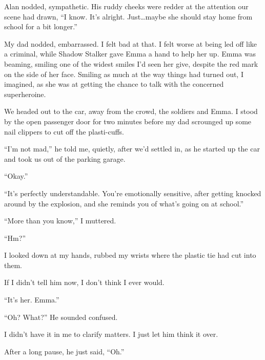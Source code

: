 Alan nodded, sympathetic.  His ruddy cheeks were redder at the attention our scene had drawn, ``I know.  It's alright.  Just\ldots maybe she should stay home from school for a bit longer.''



My dad nodded, embarrassed.  I felt bad at that.  I felt worse at being led off like a criminal, while Shadow Stalker gave Emma a hand to help her up.  Emma was beaming, smiling one of the widest smiles I'd seen her give, despite the red mark on the side of her face.  Smiling as much at the way things had turned out, I imagined, as she was at getting the chance to talk with the concerned superheroine.



We headed out to the car, away from the crowd, the soldiers and Emma.  I stood by the open passenger door for two minutes before my dad scrounged up some nail clippers to cut off the plasti-cuffs.



``I'm not mad,'' he told me, quietly, after we'd settled in, as he started up the car and took us out of the parking garage.



``Okay.''



``It's perfectly understandable.  You're emotionally sensitive, after getting knocked around by the explosion, and she reminds you of what's going on at school.''



``More than you know,'' I muttered.



``Hm?''



I looked down at my hands, rubbed my wrists where the plastic tie had cut into them.



If I didn't tell him now, I don't think I ever would.



``It's her.  Emma.''



``Oh?  What?'' He sounded confused.



I didn't have it in me to clarify matters.  I just let him think it over.



After a long pause, he just said, ``Oh.''



